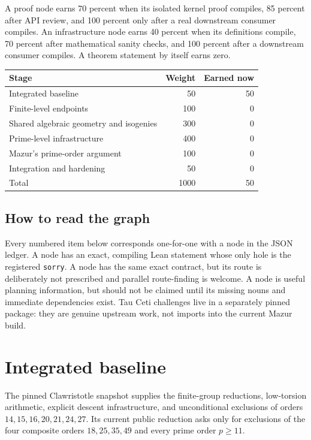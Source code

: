 \begin{definition}\label{def:credit}
A proof node earns 70 percent when its isolated kernel proof compiles, 85
percent after API review, and 100 percent only after a real downstream
consumer compiles.  An infrastructure node earns 40 percent when its
definitions compile, 70 percent after mathematical sanity checks, and 100
percent after a downstream consumer compiles.  A theorem statement by itself
earns zero.
\end{definition}

\begin{center}
\begin{tabular}{lrr}
\hline
Stage & Weight & Earned now\\
\hline
Integrated baseline & 50 & 50\\
Finite-level endpoints & 100 & 0\\
Shared algebraic geometry and isogenies & 300 & 0\\
Prime-level infrastructure & 400 & 0\\
Mazur's prime-order argument & 100 & 0\\
Integration and hardening & 50 & 0\\
\hline
Total & 1000 & 50\\
\hline
\end{tabular}
\end{center}

\section{How to read the graph}

Every numbered item below corresponds one-for-one with a node in the JSON
ledger.  A \claimable{} node has an exact, compiling Lean statement whose only
hole is the registered \texttt{sorry}.  A \researchopen{} node has the same
exact contract, but its route is deliberately not prescribed and parallel
route-finding is welcome.  A \blocked{} node is useful planning information,
but should not be claimed until its missing nouns and immediate dependencies
exist.  Tau Ceti challenges live in a separately pinned package: they are
genuine upstream work, not imports into the current Mazur build.

\chapter{Integrated baseline}

\begin{milestone}\label{node:MT-BASE-INTEGRATED}
The pinned Clawristotle snapshot supplies the finite-group reductions,
low-torsion arithmetic, explicit descent infrastructure, and unconditional
exclusions of orders \(14,15,16,20,21,24,27\).  Its current public reduction
asks only for exclusions of the four composite orders \(18,25,35,49\) and
every prime order \(p\geq 11\).
\leanok
\end{milestone}

